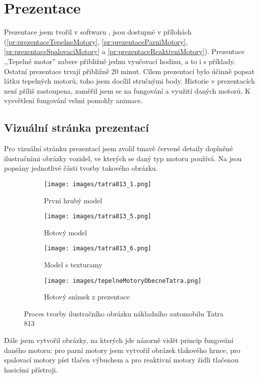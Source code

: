 \section{Prezentace}
{Prezentace jsem tvořil v softwaru , jsou dostupné v přílohách (\ref{pr:prezentaceTepelneMotory}, \ref{pr:prezentaceParniMotory}, \ref{pr:prezentaceSpalovaciMotory} a \ref{pr:prezentaceReaktivniMotory}). Prezentace ,,Tepelné motor'' zabere přibližně jednu vyučovací hodinu, a to i s příklady. Ostatní prezentace trvají přibližně 20 minut.}\odst
{Cílem prezentací bylo účinně popsat látku tepelných motorů, toho jsem docílil stručnými body. Historie v prezentacích není příliš zastoupena, zaměřil jsem se na fungování a využití daných motorů. K vysvětlení fungování velmi pomohly animace.}

\subsection{Vizuální stránka prezentací}
{Pro vizuální stránku prezentací jsem zvolil tmavě červené detaily doplněné ilustračními obrázky vozidel, ve kterých se daný typ motoru používá. Na  jsou popsány jednotlivé části tvorby takového obrázku.}

\begin{figure}[H]
    \begin{subfigure}{0.5\textwidth}
        \centering
        \texttt{[image: images/tatra813\_1.png]}\\
        \caption{První hrubý model}
    \end{subfigure}
    \begin{subfigure}{0.5\linewidth}
        \centering
        \texttt{[image: images/tatra813\_5.png]}\\
        \caption{Hotový model}
    \end{subfigure}
    \begin{subfigure}{0.5\linewidth}
        \centering
        \texttt{[image: images/tatra813\_6.png]}\\
        \caption{Model s texturamy}
    \end{subfigure}
    \begin{subfigure}{0.5\linewidth}
        \centering
        \texttt{[image: images/tepelneMotoryObecneTatra.png]}\\
        \caption{Hotový snímek z prezentace}
    \end{subfigure}
    \caption{Proces tvorby ilustračního obrázku nákladního automobilu Tatra 813 \jaObr}
    \label{obr:tatra813}
\end{figure}

{Dále jsem vytvořil obrázky, na kterých jde názorně vidět princip fungování daného motoru: pro parní motory jsem vytvořil obrázek tlakového hrnce, pro spalovací motory píst tlačen výbuchem a pro reaktivní motory židli tlačenou hasicími přístroji.}